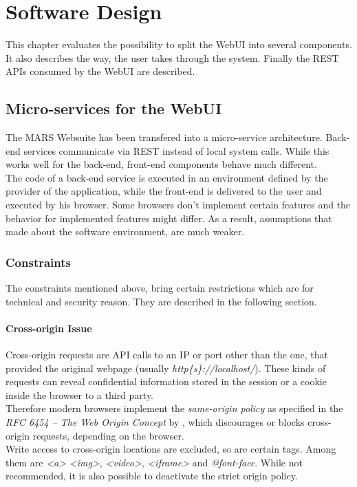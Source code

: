 
\chapter{Software Design}
This chapter evaluates the possibility to split the WebUI into several components. It also describes the way, the user takes through the system. Finally the REST APIs consumed by the WebUI are described.



\section{Micro-services for the WebUI}
\label{sec:MS_for_WebUI}
The MARS Websuite has been transfered into a micro-service architecture. Back-end services communicate via REST instead of local system calls. While this works well for the back-end, front-end components behave much different.\\
The code of a back-end service is executed in an environment defined by the provider of the application, while the front-end is delivered to the user and executed by his browser. Some browsers don't implement certain features and the behavior for implemented features might differ. As a result, assumptions that made about the software environment, are much weaker. 


\subsection{Constraints}
The constraints mentioned above, bring certain restrictions which are for technical and security reason. They are described in the following section.

\subsubsection{Cross-origin Issue}
Cross-origin requests are API calls to an IP or port other than the one, that provided the original webpage (usually \textit{http\{s\}://localhost/}). These kinds of requests can reveal confidential information stored in the session or a cookie inside the browser to a third party.\\
Therefore modern browsers implement the \textit{same-origin policy} as specified in the \textit{RFC 6454 -- The Web Origin Concept} by \cite{barth2011web}, which discourages or blocks cross-origin requests, depending on the browser.\\
Write access to cross-origin locations are excluded, so are certain tags. Among them are \textit{<a>} \textit{<img>}, \textit{<video>}, \textit{<iframe>} and \textit{@font-face}. While not recommended, it is also possible to deactivate the strict origin policy.

